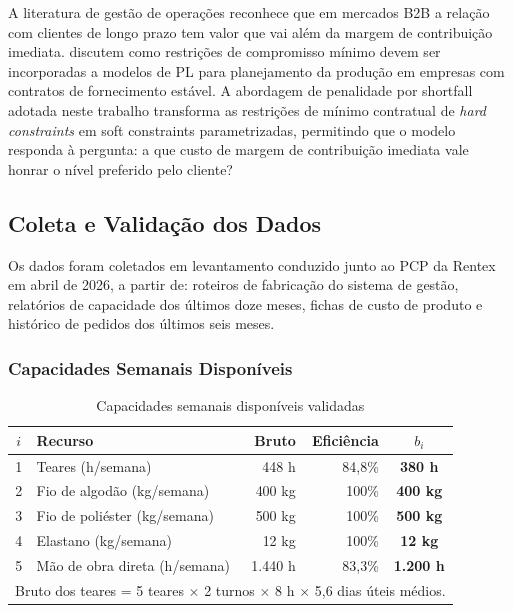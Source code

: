 A literatura de gestão de operações reconhece que em mercados B2B a relação com
clientes de longo prazo tem valor que vai além da margem de contribuição imediata.
\textcite{arenales2007} discutem como restrições de compromisso mínimo devem
ser incorporadas a modelos de PL para planejamento da produção em empresas com
contratos de fornecimento estável. A abordagem de penalidade por shortfall
adotada neste trabalho transforma as restrições de mínimo contratual de
\textit{hard constraints} em soft constraints parametrizadas, permitindo que o
modelo responda à pergunta: a que custo de margem de contribuição imediata
vale honrar o nível preferido pelo cliente?

\newpage

\subsection{Coleta e Validação dos Dados}

Os dados foram coletados em levantamento conduzido junto ao PCP da Rentex em
abril de 2026, a partir de: roteiros de fabricação do sistema de gestão, relatórios
de capacidade dos últimos doze meses, fichas de custo de produto e histórico de
pedidos dos últimos seis meses.

\subsubsection{Capacidades Semanais Disponíveis}

\begin{table}[H]
\centering
\caption{Capacidades semanais disponíveis validadas}
\label{tab:cap_r2}
\begin{tabular}{clrrc}
\toprule
\textbf{$i$} & \textbf{Recurso} & \textbf{Bruto} & \textbf{Eficiência} & \textbf{$b_i$} \\
\midrule
1 & Teares (h/semana)              & 448 h   & 84,8\% & \textbf{380 h}   \\
2 & Fio de algodão (kg/semana)     & 400 kg  & 100\%  & \textbf{400 kg}  \\
3 & Fio de poliéster (kg/semana)   & 500 kg  & 100\%  & \textbf{500 kg}  \\
4 & Elastano (kg/semana)           &  12 kg  & 100\%  & \textbf{12 kg}   \\
5 & Mão de obra direta (h/semana)  & 1.440 h & 83,3\% & \textbf{1.200 h} \\
\bottomrule
\multicolumn{5}{l}{\footnotesize Bruto dos teares = 5 teares $\times$ 2 turnos $\times$ 8 h $\times$ 5,6 dias úteis médios.}
\end{tabular}
\end{table}

